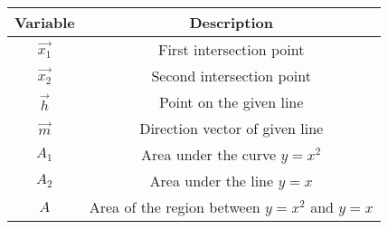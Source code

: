 \begin{tabular}[12pt]{ |c|c|}
    \hline
    \textbf{Variable} & \textbf{Description}\\ 
    \hline
    $\vec{x_1}$ & First intersection point\\
    \hline
    $\vec{x_2}$ & Second intersection point\\
    \hline
    $\vec{h}$ & Point on the given line\\
    \hline
    $\vec{m}$ & Direction vector of given line\\
    \hline
    $A_1$ & Area under the curve $y=x^2$\\
    \hline
    $A_2$ & Area under the line $y=x$\\
    \hline
    $A$ & Area of the region between $y=x^2$ and $y=x$\\
    \hline
    \end{tabular}
